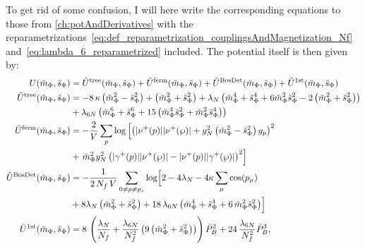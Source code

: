 To get rid of some confusion, I will here write the corresponding equations to those from \ref{ch:potAndDerivatives} with the 
reparametrizations~\eqref{eq:def_reparametrization_couplingsAndMagnetization_Nf} and~\eqref{eq:lambda_6_reparametrized} included. The potential itself is then given by:
\begin{align}\label{eq:CEP_shortCut_rescaled}
 U(\breve m_{\Phi}, \breve s_{\Phi}) &= 
                            \tilde U^{\text{tree}}(\breve m_{\Phi}, \breve s_{\Phi}) + \tilde U^{\text{ferm}}(\breve m_{\Phi}, \breve s_{\Phi})
                          + \tilde U^{\text{BosDet}}(\breve m_{\Phi}, \breve s_{\Phi}) + \tilde U^{\text{1st}}(\breve m_{\Phi}, \breve s_{\Phi})
%                           
              \\ \label{CEP_treeLevel_rescaled}
 \tilde U^{\text{tree}}(\breve m_{\Phi}, \breve s_{\Phi}) & = 
                          - 8\, \kappa \left( \breve m_{\Phi}^2 - \breve s_{\Phi}^2 \right)   +   \left( \breve m_{\Phi}^2 + \breve s_{\Phi}^2 \right)
                          + \lambda_N \left( \breve m_{\Phi}^4 + \breve s_{\Phi}^4 + 6 \breve m_{\Phi}^2 \breve s_{\Phi}^2 
                          - 2 \left(\breve m_{\Phi}^2 + \breve s_{\Phi}^2 \right) \right) 
              \nonumber \\
                        & + \lambda_{6N} \left( \breve m_{\Phi}^6 + \breve s_{\Phi}^6 + 15 \left( \breve m_{\Phi}^4 \breve s_{\Phi}^2 
                          + \breve m_{\Phi}^2 \breve s_{\Phi}^4 \right)   \right)
%                           
              \\ \label{eq:CEP_ferionicContribution_rescaled}
 \tilde U^{\text{ferm}}(\breve m_{\Phi}, \breve s_{\Phi}) & = 
                          - \frac{2}{V} \sum\limits_p \log \left[ \left( |\nu^+(p)| |\nu^+(\wp)|   +
                           y_N^2 \left( \breve m_{\Phi}^2 - \breve s_{\Phi}^2 \right) g_p\right)^2  \right.
               \nonumber \\ 
                        & + \left. \breve m_{\Phi}^2 y_N^2 \left( |\gamma^+(p)| |\nu^+(\wp)|   -   |\nu^+(p)| |\gamma^+(\wp)| \right)^2\right] 
%                         
               \\ \label{eq:CEP_bosonicDeterminantContribution_rescaled}
 \tilde U^{\text{BosDet}}(\breve m_{\Phi}, \breve s_{\Phi}) & = 
                          - \frac{1}{2\,N_f\,V}\sum\limits_{0 \neq p \neq p_s} 
                            \log\Bigl[ 2 - 4 \lambda_N - 4 \kappa \sum_{\mu} \cos(p_{\mu})
               \nonumber \\
                        & + 8 \lambda_N \left( \breve m_{\Phi}^2 + \breve s_{\Phi}^2  \right) 
                          + 18\, \lambda_{6N}\left( \breve m_{\Phi}^4 + \breve s_{\Phi}^4 + 6\,  \breve m_{\Phi}^2 \breve s_{\Phi}^2 \right)\Bigr]
%                           
               \\ \label{eq:CEP_bosonicFirstOrderContribution_rescaled}
 \tilde U^{\text{1st}}(\breve m_{\Phi}, \breve s_{\Phi}) & = 
                            8\,\left(\frac{\lambda_N}{N_f} + \frac{\lambda_{6N}}{N_f^2}\left( 
                            9\left( \breve m_{\Phi}^2 + \breve s_{\Phi}^2 \right) \right) \right) \tilde P_B^2 + 24\,\frac{\lambda_{6N}}{N_f^2} \tilde P_B^3,
\end{align}


